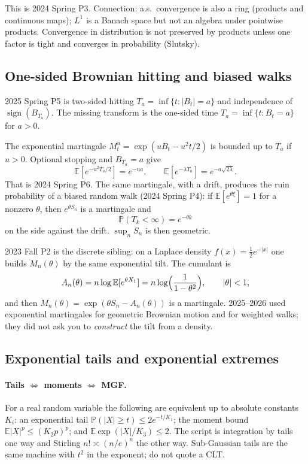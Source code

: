 This is 2024 Spring P3. Connection: a.s.\ convergence is also a ring (products and continuous maps); \(L^{1}\) is a Banach space but not an algebra under pointwise products. Convergence in distribution is not preserved by products unless one factor is tight and converges in probability (Slutsky).

\subsection{One-sided Brownian hitting and biased walks}

2025 Spring P5 is two-sided hitting \(T_{a}=\inf\{t:\lvert B_{t}\rvert=a\}\) and independence of \(\operatorname{sign}(B_{T_{a}})\). The missing transform is the one-sided time \(T_{a}=\inf\{t:B_{t}=a\}\) for \(a>0\).

The exponential martingale \(M_{t}^{u}=\exp(uB_{t}-u^{2}t/2)\) is bounded up to \(T_{a}\) if \(u>0\). Optional stopping and \(B_{T_{a}}=a\) give
\[
\mathbb{E}[e^{-u^{2}T_{a}/2}]=e^{-ua},
\qquad
\mathbb{E}[e^{-\lambda T_{a}}]=e^{-a\sqrt{2\lambda}}.
\]
That is 2024 Spring P6. The same martingale, with a drift, produces the ruin probability of a biased random walk (2024 Spring P4): if \(\mathbb{E}[e^{\theta\xi}]=1\) for a nonzero \(\theta\), then \(e^{\theta S_{n}}\) is a martingale and
\[
\mathbb{P}(T_{k}<\infty)=e^{-\theta k}
\]
on the side against the drift. \(\sup_{n}S_{n}\) is then geometric.

2023 Fall P2 is the discrete sibling: on a Laplace density \(f(x)=\tfrac12 e^{-\lvert x\rvert}\) one builds \(M_{n}(\theta)\) by the same exponential tilt. The cumulant is
\[
A_{n}(\theta)
=
n\log\mathbb{E}[e^{\theta X_{1}}]
=
n\log\Bigl(\frac{1}{1-\theta^{2}}\Bigr),
\qquad
\lvert\theta\rvert<1,
\]
and then \(M_{n}(\theta)=\exp(\theta S_{n}-A_{n}(\theta))\) is a martingale. 2025--2026 used exponential martingales for geometric Brownian motion and for weighted walks; they did not ask you to \emph{construct} the tilt from a density.

\subsection{Exponential tails and exponential extremes}

\paragraph{Tails \(\Leftrightarrow\) moments \(\Leftrightarrow\) MGF.}
 For a real random variable the following are equivalent up to absolute constants \(K_{i}\): an exponential tail \(\mathbb{P}(\lvert X\rvert\ge t)\le 2e^{-t/K_{1}}\); the moment bound \(\mathbb{E}\lvert X\rvert^{p}\le(K_{2}p)^{p}\); and \(\mathbb{E}\exp(\lvert X\rvert/K_{3})\le 2\). The script is integration by tails one way and Stirling \(n!\asymp(n/e)^{n}\) the other way. Sub-Gaussian tails are the same machine with \(t^{2}\) in the exponent; do not quote a CLT.

